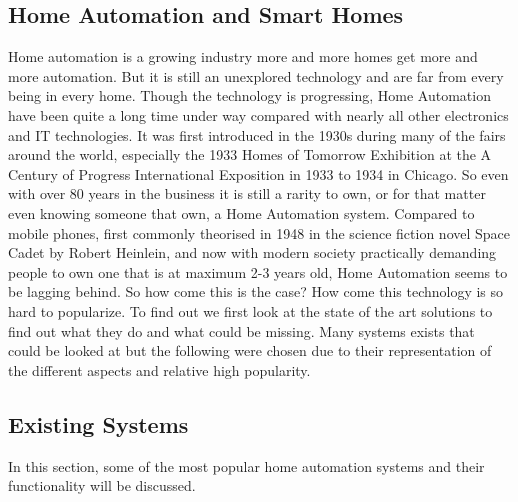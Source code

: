 \subsection{Home Automation and Smart Homes}
Home automation is a growing industry more and more homes get more and more automation. But it is still an unexplored technology and are far from every being in every home. Though the technology is progressing, Home Automation have been quite a long time under way compared with nearly all other electronics and IT technologies. It was first introduced in the 1930s during many of the fairs around the world, especially the 1933 Homes of Tomorrow Exhibition at the A Century of Progress International Exposition in 1933 to 1934 in Chicago. So even with over 80 years in the business it is still a rarity to own, or for that matter even knowing someone that own, a Home Automation system. Compared to mobile phones, first commonly theorised in 1948 in the science fiction novel Space Cadet by Robert Heinlein, and now with modern society practically demanding people to own one that is at maximum 2-3 years old, Home Automation seems to be lagging behind. So how come this is the case? How come this technology is so hard to popularize. To find out we first look at the state of the art solutions to find out what they do and what could be missing. Many systems exists that could be looked at but the following were chosen due to their representation of the different aspects and relative high popularity.

\subsection{Existing Systems}
In this section, some of the most popular home automation systems and their functionality will be discussed.

